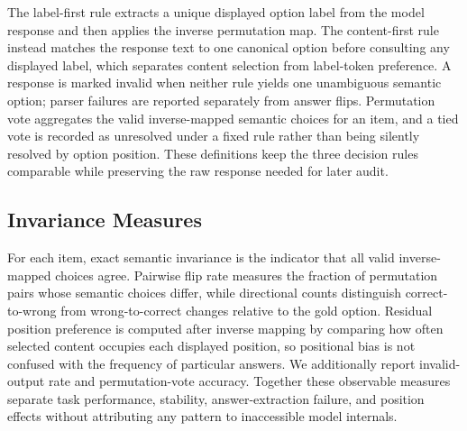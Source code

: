The label-first rule extracts a unique displayed option label from the model response and then applies the inverse permutation map. The content-first rule instead matches the response text to one canonical option before consulting any displayed label, which separates content selection from label-token preference. A response is marked invalid when neither rule yields one unambiguous semantic option; parser failures are reported separately from answer flips. Permutation vote aggregates the valid inverse-mapped semantic choices for an item, and a tied vote is recorded as unresolved under a fixed rule rather than being silently resolved by option position. These definitions keep the three decision rules comparable while preserving the raw response needed for later audit.


\subsection{Invariance Measures}

For each item, exact semantic invariance is the indicator that all valid inverse-mapped choices agree. Pairwise flip rate measures the fraction of permutation pairs whose semantic choices differ, while directional counts distinguish correct-to-wrong from wrong-to-correct changes relative to the gold option. Residual position preference is computed after inverse mapping by comparing how often selected content occupies each displayed position, so positional bias is not confused with the frequency of particular answers. We additionally report invalid-output rate and permutation-vote accuracy. Together these observable measures separate task performance, stability, answer-extraction failure, and position effects without attributing any pattern to inaccessible model internals.
